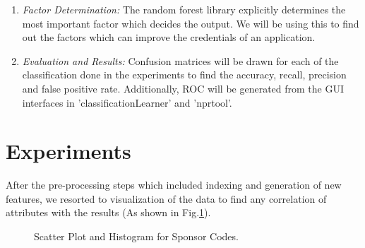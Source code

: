 \documentclass{article} %
\begin{document}
\begin{enumerate}
	 \item \emph{Factor Determination:} The random forest library explicitly determines the most important factor which decides the output. We will be using this to find out the factors which can improve the credentials of an application.
	 
	 \item \emph{Evaluation and Results:} Confusion matrices will be drawn for each of the classification done in the experiments to find the accuracy, recall, precision and false positive rate. Additionally, ROC will be generated from the GUI interfaces in 'classificationLearner' and 'nprtool'.
	
	\end{enumerate}
	
	
\section{Experiments}

After the pre-processing steps which included indexing and generation of new features, we resorted to visualization of the data to find any correlation of attributes with the results (As shown in Fig.\ref{fig:sponsor}).

\begin{figure}[h]
	\begin{center}
	\end{center}
	\caption{Scatter Plot and Histogram for Sponsor Codes.}
	\label{fig:sponsor}
\end{figure}
\end{document}
